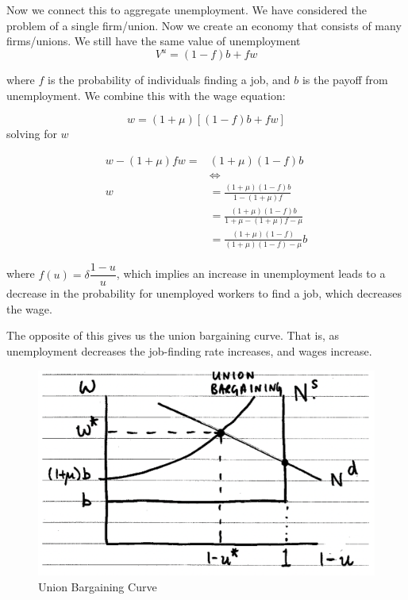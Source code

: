 \documentclass[11pt]{article}
\begin{document}
Now we connect this to aggregate unemployment. We have considered the problem of a single firm/union. Now we create an economy that consists of many firms/unions. We still have the same value of unemployment
\[V^u = (1-f)b +fw\]

where $f$ is the probability of individuals finding a job, and $b$ is the payoff from unemployment. We combine this with the wage equation:

\[w = (1+\mu)[(1-f)b + fw]\]
solving for $w$

\begin{equation}
\begin{aligned}
w-(1+\mu) f w= & (1+\mu)(1-f) b \\
& \Longleftrightarrow \\
w & =\frac{(1+\mu)(1-f) b}{1-(1+\mu) f} \\
& =\frac{(1+\mu)(1-f) b}{1+\mu-(1+\mu) f-\mu} \\
& =\frac{(1+\mu)(1-f)}{(1+\mu)(1-f)-\mu} b
\end{aligned}
\end{equation}

where $f(u)=\delta\dfrac{1-u}{u}$, which implies an increase in unemployment leads to a decrease in the probability for unemployed workers to find a job, which decreases the wage.

The opposite of this gives us the union bargaining curve. That is, as unemployment decreases the job-finding rate increases, and wages increase.

\begin{figure}[h]
    \centering
    \includegraphics[width=12cm]{photos/union bargaining curve.png}
    \caption{Union Bargaining Curve}
    \label{fig:union bargaining curve}
\end{figure}
\end{document}
